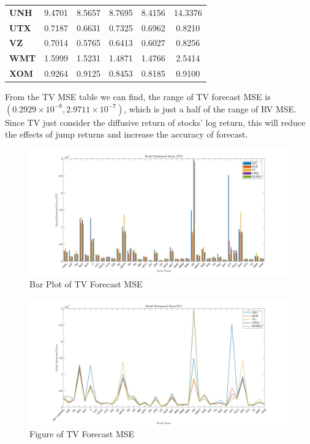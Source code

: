 \documentclass[12pt,letterpaper]{article}
\begin{document}
\begin{enumerate}[label=\textbf{(\Alph*)}]
\begin{table}[ht]
{\begin{tabular}{lccccc}
	\textbf{UNH}   & 9.4701       & 8.5657        & 8.7695       & 8.4156         & 14.3376     \\
	\textbf{UTX}   & 0.7187       & 0.6631        & 0.7325       & 0.6962         & 0.8210      \\
	\textbf{VZ}    & 0.7014       & 0.5765        & 0.6413       & 0.6027         & 0.8256      \\
	\textbf{WMT}   & 1.5999       & 1.5231        & 1.4871       & 1.4766         & 2.5414      \\
	\textbf{XOM}   & 0.9264       & 0.9125        & 0.8453       & 0.8185         & 0.9100      \\  \hline
	\end{tabular}}
\end{table}

From the TV MSE table we can find, the range of TV forecast MSE is $(0.2929\times 10^{-8},2.9711\times 10^{-7})$, which is just a half of the range of RV MSE. Since TV just consider the diffusive return of stocks' log return, this will reduce the effects of jump returns and increase the accuracy of forecast.

\newpage

\begin{figure}[H]	
	\centering
	\includegraphics[width=12cm]{figures/3D11.jpg}
	\centering
	\caption{ Bar Plot of TV Forecast MSE}
\end{figure}

\begin{figure}[H]	
	\centering
	\includegraphics[width=12cm]{figures/3D22.jpg}
	\centering
	\caption{ Figure of TV Forecast MSE}
\end{figure}


\end{enumerate}
\end{document}
